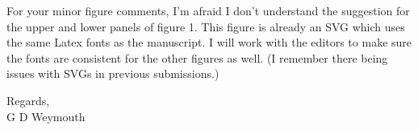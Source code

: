 \documentclass[12pt]{letter}
\begin{document}
For your minor figure comments, I'm afraid I don't understand the suggestion for the upper and lower panels of figure 1. This figure is already an SVG which uses the same Latex fonts as the manuscript. I will work with the editors to make sure the fonts are consistent for the other figures as well. (I remember there being issues with SVGs in previous submissions.)

Regards,\\
G D Weymouth
\end{document}
